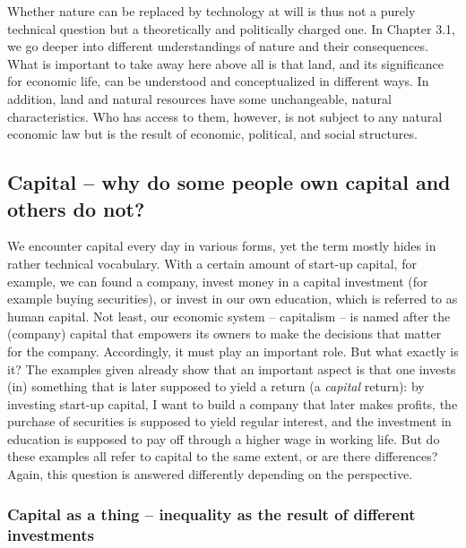 \documentclass[
  british,
  a4paper,
  DIV=11,
  numbers=noendperiod,
  oneside,
  openany]{scrreprt}
\begin{document}
Whether nature can be replaced by technology at will is thus not a
purely technical question but a theoretically and politically charged
one. In Chapter 3.1, we go deeper into different understandings of
nature and their consequences. What is important to take away here above
all is that land, and its significance for economic life, can be
understood and conceptualized in different ways. In addition, land and
natural resources have some unchangeable, natural characteristics. Who
has access to them, however, is not subject to any natural economic law
but is the result of economic, political, and social structures.

\subsection{Capital -- why do some people own capital and others do
not?}\label{capital-why-do-some-people-own-capital-and-others-do-not}

We encounter capital every day in various forms, yet the term mostly
hides in rather technical vocabulary. With a certain amount of start-up
capital, for example, we can found a company, invest money in a capital
investment (for example buying securities), or invest in our own
education, which is referred to as human capital. Not least, our
economic system -- capitalism -- is named after the (company) capital
that empowers its owners to make the decisions that matter for the
company. Accordingly, it must play an important role. But what exactly
is it? The examples given already show that an important aspect is that
one invests (in) something that is later supposed to yield a return (a
\emph{capital} return): by investing start-up capital, I want to build a
company that later makes profits, the purchase of securities is supposed
to yield regular interest, and the investment in education is supposed
to pay off through a higher wage in working life. But do these examples
all refer to capital to the same extent, or are there differences?
Again, this question is answered differently depending on the
perspective.

\subsubsection{Capital as a thing -- inequality as the result of
different
investments}\label{capital-as-a-thing-inequality-as-the-result-of-different-investments}
\end{document}
